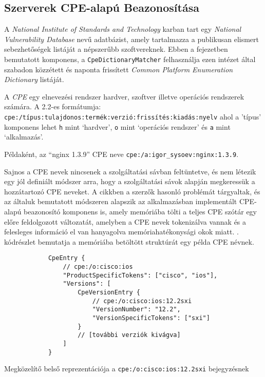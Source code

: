 \subsection*{Szerverek CPE-alapú Beazonosítása}

	A \textit{National Institute of Standards and Technology} karban tart egy \textit{National Vulnerability Database} nevű adatbázist, amely tartalmazza a publikusan elismert sebezhetőségek listáját a népszerűbb szoftvereknek. Ebben a fejezetben bemutatott komponens, a \texttt{CpeDictionaryMatcher} felhasználja ezen intézet által szabadon közzétett és naponta frissített \textit{Common Platform Enumeration Dictionary} listáját.
	
	A \textit{CPE} egy elnevezési rendszer hardver, szoftver illetve operációs rendszerek számára\cite{cpe22}. A 2.2-es formátumja: \texttt{cpe:/típus:tulajdonos:termék:verzió:frissítés:kiadás:nyelv} ahol a 'típus' komponens lehet \texttt{h} mint `hardver', \texttt{o} mint `operációs rendszer' és \texttt{a} mint `alkalmazás'.
	
	Példaként, az ``nginx 1.3.9'' CPE neve \texttt{cpe:/a:igor_sysoev:nginx:1.3.9}.
	
	Sajnos a CPE nevek nincsenek a szolgáltatási sávban feltüntetve, és nem létezik egy jól definiált módszer arra, hogy a szolgáltatási sávok alapján megkeressük a hozzátartozó CPE neveket. A \cite{shovat15} cikkben a szerzők hasonló problémát tárgyaltak, és az általuk bemutatott módszeren alapszik az alkalmazásban implementált CPE-alapú beazonosító komponens is, amely memóriába tölti a teljes CPE szótár egy előre feldolgozott változatát, amelyben a CPE nevek tokenizálva vannak és a felesleges információ el van hanyagolva memóriahatékonysági okok miatt. \Az{\ref{ciscotokens_hu}}. kódrészlet bemutatja a memóriába betöltött struktúrát egy példa CPE névnek.
	
	\begin{listing}[H]
		\begin{verbatim}
			CpeEntry {
				// cpe:/o:cisco:ios
				"ProductSpecificTokens": ["cisco", "ios"],
				"Versions": [
					CpeVersionEntry {
						// cpe:/o:cisco:ios:12.2sxi
						"VersionNumber": "12.2",
						"VersionSpecificTokens": ["sxi"]
					}
					// [további verziók kivágva]
				]
			}
		\end{verbatim}
		\caption{Megközelítő belső reprezentációja a \texttt{cpe:/o:cisco:ios:12.2sxi} bejegyzésnek}
		\label{ciscotokens_hu}
	\end{listing}
	
